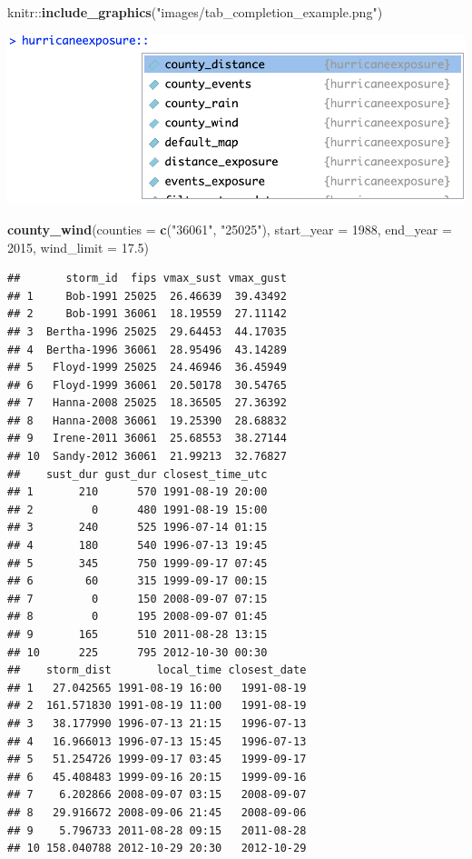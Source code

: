\documentclass[]{tufte-book}
\newenvironment{Shaded}{}{}
\newcommand{\DataTypeTok}[1]{\textcolor[rgb]{0.56,0.13,0.00}{#1}}
\newcommand{\DecValTok}[1]{\textcolor[rgb]{0.25,0.63,0.44}{#1}}
\newcommand{\FloatTok}[1]{\textcolor[rgb]{0.25,0.63,0.44}{#1}}
\newcommand{\KeywordTok}[1]{\textcolor[rgb]{0.00,0.44,0.13}{\textbf{#1}}}
\newcommand{\NormalTok}[1]{#1}
\newcommand{\OperatorTok}[1]{\textcolor[rgb]{0.40,0.40,0.40}{#1}}
\newcommand{\StringTok}[1]{\textcolor[rgb]{0.25,0.44,0.63}{#1}}
\begin{document}
\begin{Shaded}
\begin{Highlighting}[]
\NormalTok{knitr}\OperatorTok{::}\KeywordTok{include_graphics}\NormalTok{(}\StringTok{"images/tab_completion_example.png"}\NormalTok{)}
\end{Highlighting}
\end{Shaded}

\begin{marginfigure}
\includegraphics[width=13.68in]{images/tab_completion_example} \end{marginfigure}

\begin{Shaded}
\begin{Highlighting}[]
\KeywordTok{county_wind}\NormalTok{(}\DataTypeTok{counties =} \KeywordTok{c}\NormalTok{(}\StringTok{"36061"}\NormalTok{, }\StringTok{"25025"}\NormalTok{), }\DataTypeTok{start_year =} \DecValTok{1988}\NormalTok{, }
    \DataTypeTok{end_year =} \DecValTok{2015}\NormalTok{, }\DataTypeTok{wind_limit =} \FloatTok{17.5}\NormalTok{)}
\end{Highlighting}
\end{Shaded}

\begin{verbatim}
##       storm_id  fips vmax_sust vmax_gust
## 1     Bob-1991 25025  26.46639  39.43492
## 2     Bob-1991 36061  18.19559  27.11142
## 3  Bertha-1996 25025  29.64453  44.17035
## 4  Bertha-1996 36061  28.95496  43.14289
## 5   Floyd-1999 25025  24.46946  36.45949
## 6   Floyd-1999 36061  20.50178  30.54765
## 7   Hanna-2008 25025  18.36505  27.36392
## 8   Hanna-2008 36061  19.25390  28.68832
## 9   Irene-2011 36061  25.68553  38.27144
## 10  Sandy-2012 36061  21.99213  32.76827
##    sust_dur gust_dur closest_time_utc
## 1       210      570 1991-08-19 20:00
## 2         0      480 1991-08-19 15:00
## 3       240      525 1996-07-14 01:15
## 4       180      540 1996-07-13 19:45
## 5       345      750 1999-09-17 07:45
## 6        60      315 1999-09-17 00:15
## 7         0      150 2008-09-07 07:15
## 8         0      195 2008-09-07 01:45
## 9       165      510 2011-08-28 13:15
## 10      225      795 2012-10-30 00:30
##    storm_dist       local_time closest_date
## 1   27.042565 1991-08-19 16:00   1991-08-19
## 2  161.571830 1991-08-19 11:00   1991-08-19
## 3   38.177990 1996-07-13 21:15   1996-07-13
## 4   16.966013 1996-07-13 15:45   1996-07-13
## 5   51.254726 1999-09-17 03:45   1999-09-17
## 6   45.408483 1999-09-16 20:15   1999-09-16
## 7    6.202866 2008-09-07 03:15   2008-09-07
## 8   29.916672 2008-09-06 21:45   2008-09-06
## 9    5.796733 2011-08-28 09:15   2011-08-28
## 10 158.040788 2012-10-29 20:30   2012-10-29
\end{verbatim}
\end{document}
